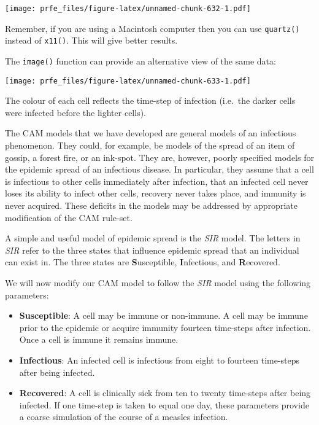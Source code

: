 \documentclass[
  12pt,
  a4paper]{book}
\newenvironment{Shaded}{\begin{snugshade}}{\end{snugshade}}
\newcommand{\AttributeTok}[1]{\textcolor[rgb]{0.77,0.63,0.00}{#1}}
\newcommand{\ConstantTok}[1]{\textcolor[rgb]{0.00,0.00,0.00}{#1}}
\newcommand{\FunctionTok}[1]{\textcolor[rgb]{0.00,0.00,0.00}{#1}}
\newcommand{\NormalTok}[1]{#1}
\newcommand{\SpecialCharTok}[1]{\textcolor[rgb]{0.00,0.00,0.00}{#1}}
\begin{document}
\texttt{[image: prfe\_files/figure-latex/unnamed-chunk-632-1.pdf]}

Remember, if you are using a Macintosh computer then you can use \texttt{quartz()} instead of \texttt{x11()}. This will give better results.

The \texttt{image()} function can provide an alternative view of the same data:

\begin{Shaded}
\end{Shaded}

\texttt{[image: prfe\_files/figure-latex/unnamed-chunk-633-1.pdf]}

The colour of each cell reflects the time-step of infection (i.e.~the darker cells were infected before the lighter cells).

The CAM models that we have developed are general models of an infectious phenomenon. They could, for example, be models of the spread of an item of gossip, a forest fire, or an ink-spot. They are, however, poorly specified models for the epidemic spread of an infectious disease. In particular, they assume that a cell is infectious to other cells immediately after infection, that an infected cell never loses its ability to infect other cells, recovery never takes place, and immunity is never acquired. These deficits in the models may be addressed by appropriate modification of the CAM rule-set.

A simple and useful model of epidemic spread is the \emph{SIR} model. The letters in \emph{SIR} refer to the three states that influence epidemic spread that an individual can exist in. The three states are \textbf{S}usceptible, \textbf{I}nfectious, and \textbf{R}ecovered.

We will now modify our CAM model to follow the \emph{SIR} model using the following parameters:

\begin{itemize}
\item
  \textbf{Susceptible}: A cell may be immune or non-immune. A cell may be immune prior to the epidemic or
  acquire immunity fourteen time-steps after infection. Once a cell is immune it remains immune.
\item
  \textbf{Infectious}: An infected cell is infectious from eight to fourteen time-steps after being infected.
\item
  \textbf{Recovered}: A cell is clinically sick from ten to twenty time-steps after being infected. If one time-step is taken to equal one day, these parameters provide a coarse simulation of the course of a measles infection.
\end{itemize}
\end{document}

